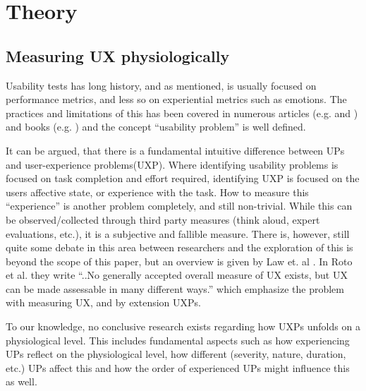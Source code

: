 \section{Theory}
\subsection{Measuring UX physiologically}
Usability tests has long history, and as mentioned, is usually focused on performance metrics, and less so
on experiential metrics such as emotions.  The practices and limitations of this has been covered in numerous articles
(e.g. \cite{usability_eval} and \cite{eval_effect}) and books (e.g. \cite{guide_to_upeval}) and the concept ``usability
problem'' is well defined.

It can be argued, that there is a fundamental intuitive difference between UPs and user-experience problems(UXP).  Where
identifying usability problems is focused on task completion and effort required, identifying UXP is focused on the
users affective state, or experience with the task.  How to measure this ``experience'' is another problem completely,
and still non-trivial. While this can be observed/collected through third party measures
(think aloud, expert evaluations, etc.), it is a subjective and fallible measure.  There is, however,
still quite some debate in this area between researchers and the exploration of this is beyond the scope of this paper,
but an overview is given by Law et. al \cite{attitudes_ux_measure}.  In Roto et al. \cite{what_is_ux} they write ``..No
generally accepted overall measure of UX exists, but UX can be made assessable in many different ways.'' which 
emphasize the problem with measuring UX, and by extension UXPs.

To our knowledge, no conclusive research exists regarding how UXPs unfolds on a physiological level. This includes
fundamental aspects such as how experiencing UPs reflect on the physiological level, how different (severity, nature,
duration, etc.) UPs affect this and how the order of experienced UPs might influence this as well.

